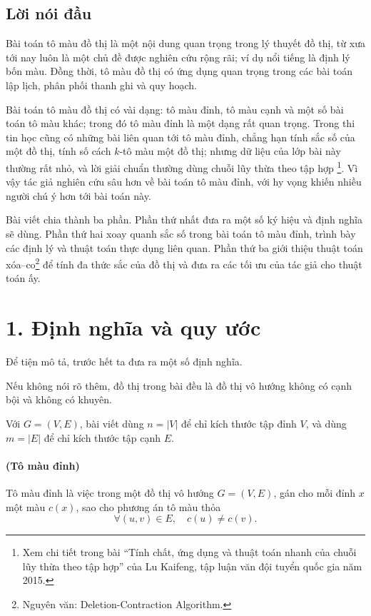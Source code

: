 \documentclass[11pt]{article}
\begin{document}
\subsection*{Lời nói đầu}

Bài toán tô màu đồ thị là một nội dung quan trọng trong lý thuyết đồ thị, từ
xưa tới nay luôn là một chủ đề được nghiên cứu rộng rãi; ví dụ nổi tiếng là
định lý bốn màu. Đồng thời, tô màu đồ thị có ứng dụng quan trọng trong các bài
toán lập lịch, phân phối thanh ghi và quy hoạch.

Bài toán tô màu đồ thị có vài dạng: tô màu đỉnh, tô màu cạnh và một số bài
toán tô màu khác; trong đó tô màu đỉnh là một dạng rất quan trọng. Trong thi
tin học cũng có những bài liên quan tới tô màu đỉnh, chẳng hạn tính sắc số của
một đồ thị, tính số cách \(k\)-tô màu một đồ thị; nhưng dữ liệu của lớp bài này
thường rất nhỏ, và lời giải chuẩn thường dùng chuỗi lũy thừa theo tập hợp
\footnote{Xem chi tiết trong bài ``Tính chất, ứng dụng và thuật toán nhanh của
chuỗi lũy thừa theo tập hợp'' của Lu Kaifeng, tập luận văn đội tuyển quốc gia
năm 2015.}. Vì vậy tác giả nghiên cứu sâu hơn về bài toán tô màu đỉnh, với hy
vọng khiến nhiều người chú ý hơn tới bài toán này.

Bài viết chia thành ba phần. Phần thứ nhất đưa ra một số ký hiệu và định nghĩa
sẽ dùng. Phần thứ hai xoay quanh sắc số trong bài toán tô màu đỉnh, trình bày
các định lý và thuật toán thực dụng liên quan. Phần thứ ba giới thiệu thuật
toán xóa--co\footnote{Nguyên văn: Deletion-Contraction Algorithm.} để tính đa
thức sắc của đồ thị và đưa ra các tối ưu của tác giả cho thuật toán ấy.

\section*{1. Định nghĩa và quy ước}

Để tiện mô tả, trước hết ta đưa ra một số định nghĩa.

Nếu không nói rõ thêm, đồ thị trong bài đều là đồ thị vô hướng không có cạnh
bội và không có khuyên.

Với \(G=(V,E)\), bài viết dùng \(n=|V|\) để chỉ kích thước tập đỉnh \(V\), và
dùng \(m=|E|\) để chỉ kích thước tập cạnh \(E\).

\paragraph{ (Tô màu đỉnh)}
Tô màu đỉnh là việc trong một đồ thị vô hướng \(G=(V,E)\), gán cho mỗi đỉnh
\(x\) một màu \(c(x)\), sao cho phương án tô màu thỏa
\[
  \forall (u,v)\in E,\quad c(u)\ne c(v).
\]
\end{document}
